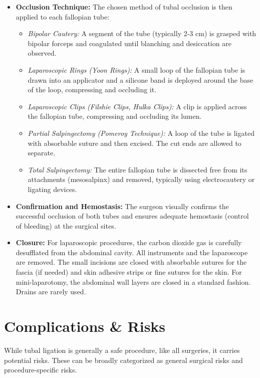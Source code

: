 \begin{itemize}
  \item \textbf{Occlusion Technique:} The chosen method of tubal occlusion is then applied to each fallopian tube:
    \begin{itemize}
      \item \textit{Bipolar Cautery:} A segment of the tube (typically 2-3 cm) is grasped with bipolar forceps and coagulated until blanching and desiccation are observed.
      \item \textit{Laparoscopic Rings (Yoon Rings):} A small loop of the fallopian tube is drawn into an applicator and a silicone band is deployed around the base of the loop, compressing and occluding it.
      \item \textit{Laparoscopic Clips (Filshie Clips, Hulka Clips):} A clip is applied across the fallopian tube, compressing and occluding its lumen.
      \item \textit{Partial Salpingectomy (Pomeroy Technique):} A loop of the tube is ligated with absorbable suture and then excised. The cut ends are allowed to separate.
      \item \textit{Total Salpingectomy:} The entire fallopian tube is dissected free from its attachments (mesosalpinx) and removed, typically using electrocautery or ligating devices.
    \end{itemize}

  \item \textbf{Confirmation and Hemostasis:} The surgeon visually confirms the successful occlusion of both tubes and ensures adequate hemostasis (control of bleeding) at the surgical sites.

  \item \textbf{Closure:} For laparoscopic procedures, the carbon dioxide gas is carefully desufflated from the abdominal cavity. All instruments and the laparoscope are removed. The small incisions are closed with absorbable sutures for the fascia (if needed) and skin adhesive strips or fine sutures for the skin. For mini-laparotomy, the abdominal wall layers are closed in a standard fashion. Drains are rarely used.
\end{itemize}

\section*{Complications \& Risks}
While tubal ligation is generally a safe procedure, like all surgeries, it carries potential risks. These can be broadly categorized as general surgical risks and procedure-specific risks.


